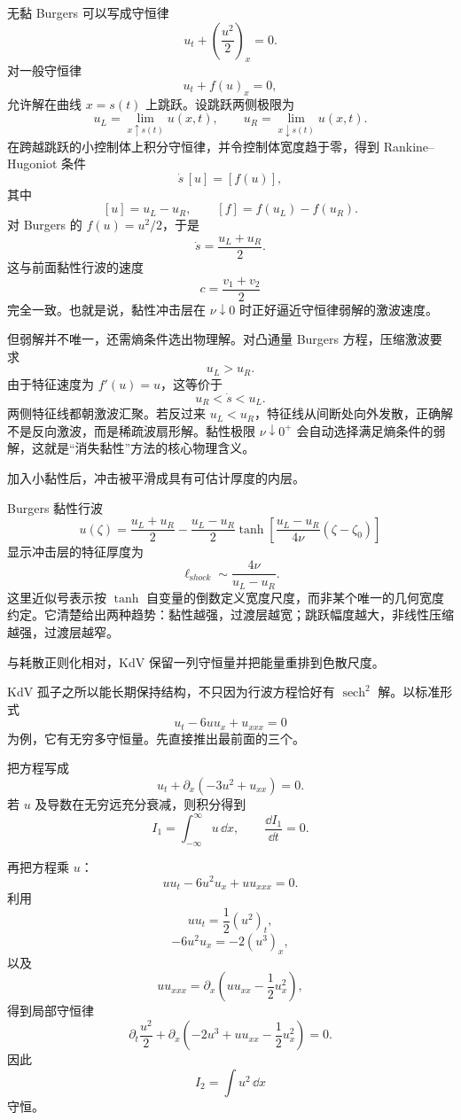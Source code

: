 无黏 Burgers 可以写成守恒律
\[
u_t+\left(\frac{u^2}{2}\right)_x=0.
\]
对一般守恒律
\[
u_t+f(u)_x=0,
\]
允许解在曲线 $x=s(t)$ 上跳跃。设跳跃两侧极限为
\[
u_L=\lim_{x\uparrow s(t)}u(x,t),
\qquad
u_R=\lim_{x\downarrow s(t)}u(x,t).
\]
在跨越跳跃的小控制体上积分守恒律，并令控制体宽度趋于零，得到 Rankine--Hugoniot 条件
\begin{equation*}{
\dot s\,[u]=[f(u)]
},\end{equation*}
其中
\[
[u]=u_L-u_R,
\qquad
[f]=f(u_L)-f(u_R).
\]
对 Burgers 的 $f(u)=u^2/2$，于是
\[
{
\dot s=\frac{u_L+u_R}{2}
}.
\]
这与前面黏性行波的速度
\[
c=\frac{v_1+v_2}{2}
\]
完全一致。也就是说，黏性冲击层在 $\nu\downarrow0$ 时正好逼近守恒律弱解的激波速度。

但弱解并不唯一，还需熵条件选出物理解。对凸通量 Burgers 方程，压缩激波要求
\[
u_L>u_R.
\]
由于特征速度为 $f'(u)=u$，这等价于
\[
u_R<\dot s<u_L.
\]
两侧特征线都朝激波汇聚。若反过来 $u_L<u_R$，特征线从间断处向外发散，正确解不是反向激波，而是稀疏波扇形解。黏性极限 $\nu\downarrow0^+$ 会自动选择满足熵条件的弱解，这就是“消失黏性”方法的核心物理含义。

加入小黏性后，冲击被平滑成具有可估计厚度的内层。

Burgers 黏性行波
\[
u(\zeta)=\frac{u_L+u_R}{2}
-\frac{u_L-u_R}{2}
\tanh\!\left[
\frac{u_L-u_R}{4\nu}(\zeta-\zeta_0)
\right]
\]
显示冲击层的特征厚度为
\begin{equation*}{
\ell_{\mathrm shock}
\sim\frac{4\nu}{u_L-u_R}
}.\end{equation*}
这里近似号表示按 $\tanh$ 自变量的倒数定义宽度尺度，而非某个唯一的几何宽度约定。它清楚给出两种趋势：黏性越强，过渡层越宽；跳跃幅度越大，非线性压缩越强，过渡层越窄。

与耗散正则化相对，KdV 保留一列守恒量并把能量重排到色散尺度。

KdV 孤子之所以能长期保持结构，不只因为行波方程恰好有 $\operatorname{sech}^2$ 解。以标准形式
\[
u_t-6u u_x+u_{xxx}=0
\]
为例，它有无穷多守恒量。先直接推出最前面的三个。

把方程写成
\[
u_t+\partial_x(-3u^2+u_{xx})=0.
\]
若 $u$ 及导数在无穷远充分衰减，则积分得到
\begin{equation*}{
I_1=\int_{-\infty}^{\infty}u\,\dd x,
\qquad
\frac{\dd I_1}{\dd t}=0
}.\end{equation*}

再把方程乘 $u$：
\[
uu_t-6u^2u_x+u u_{xxx}=0.
\]
利用
\[
uu_t=\frac12(u^2)_t,
\]
\[
-6u^2u_x=-2(u^3)_x,
\]
以及
\[
uu_{xxx}
=\partial_x\left(u u_{xx}-\frac12u_x^2\right),
\]
得到局部守恒律
\[
\partial_t\frac{u^2}{2}
+\partial_x\left(
-2u^3+u u_{xx}-\frac12u_x^2
\right)=0.
\]
因此
\begin{equation*}{
I_2=\int u^2\,\dd x
}\end{equation*}
守恒。

